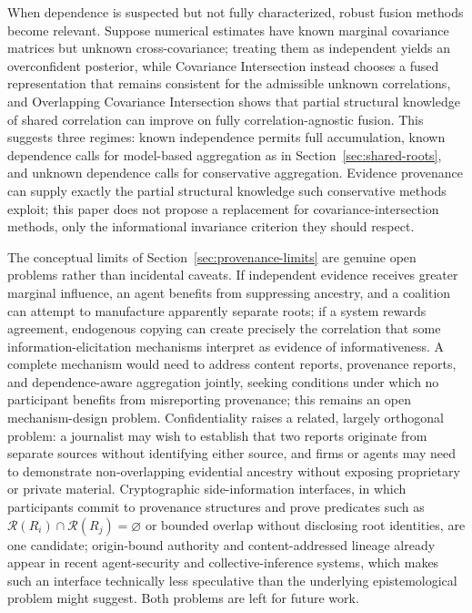\documentclass[11pt]{article}
\theoremstyle{definition}
\begin{document}
When dependence is suspected but not fully characterized, robust fusion methods become relevant. Suppose numerical estimates have known marginal covariance matrices but unknown cross-covariance; treating them as independent yields an overconfident posterior, while Covariance Intersection instead chooses a fused representation that remains consistent for the admissible unknown correlations, and Overlapping Covariance Intersection shows that partial structural knowledge of shared correlation can improve on fully correlation-agnostic fusion. This suggests three regimes: known independence permits full accumulation, known dependence calls for model-based aggregation as in Section~\ref{sec:shared-roots}, and unknown dependence calls for conservative aggregation. Evidence provenance can supply exactly the partial structural knowledge such conservative methods exploit; this paper does not propose a replacement for covariance-intersection methods, only the informational invariance criterion they should respect.

The conceptual limits of Section~\ref{sec:provenance-limits} are genuine open problems rather than incidental caveats. If independent evidence receives greater marginal influence, an agent benefits from suppressing ancestry, and a coalition can attempt to manufacture apparently separate roots; if a system rewards agreement, endogenous copying can create precisely the correlation that some information-elicitation mechanisms interpret as evidence of informativeness. A complete mechanism would need to address content reports, provenance reports, and dependence-aware aggregation jointly, seeking conditions under which no participant benefits from misreporting provenance; this remains an open mechanism-design problem. Confidentiality raises a related, largely orthogonal problem: a journalist may wish to establish that two reports originate from separate sources without identifying either source, and firms or agents may need to demonstrate non-overlapping evidential ancestry without exposing proprietary or private material. Cryptographic side-information interfaces, in which participants commit to provenance structures and prove predicates such as $\mathcal R(R_i)\cap\mathcal R(R_j)=\varnothing$ or bounded overlap without disclosing root identities, are one candidate; origin-bound authority and content-addressed lineage already appear in recent agent-security and collective-inference systems, which makes such an interface technically less speculative than the underlying epistemological problem might suggest. Both problems are left for future work.
\end{document}
